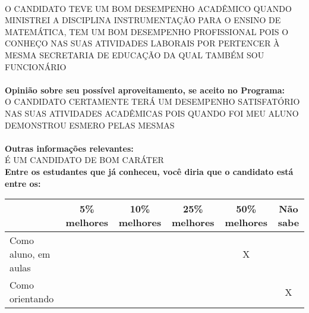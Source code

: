 \documentclass[11pt]{article}
\begin{document}
\\O CANDIDATO TEVE UM BOM DESEMPENHO ACADÊMICO QUANDO MINISTREI A DISCIPLINA INSTRUMENTAÇÃO PARA O ENSINO DE MATEMÁTICA, TEM UM BOM DESEMPENHO PROFISSIONAL POIS O CONHEÇO NAS SUAS ATIVIDADES LABORAIS POR PERTENCER À MESMA SECRETARIA DE EDUCAÇÃO DA QUAL TAMBÉM SOU FUNCIONÁRIO\\
\\
\textbf{Opinião sobre seu possível aproveitamento, se aceito no Programa:}
\\O CANDIDATO CERTAMENTE TERÁ UM DESEMPENHO SATISFATÓRIO NAS SUAS ATIVIDADES ACADÊMICAS POIS QUANDO FOI MEU ALUNO DEMONSTROU ESMERO PELAS MESMAS\\ 
\\
\textbf{Outras informações relevantes:} \\É UM CANDIDATO DE BOM CARÁTER
\\[0.3cm]
\textbf{Entre os estudantes que já conheceu, você diria que o candidato está entre os:}
\\
\begin{tabular}{|l|c|c|c|c|c|}
\hline
 & 5\% melhores & 10\% melhores & 25\% melhores & 50\% melhores & Não sabe \\
\hline
Como aluno, em aulas &  &  &  & X & \\
\hline
Como orientando &  &  &  &  & X\\
\hline
\end{tabular}
\end{document}

